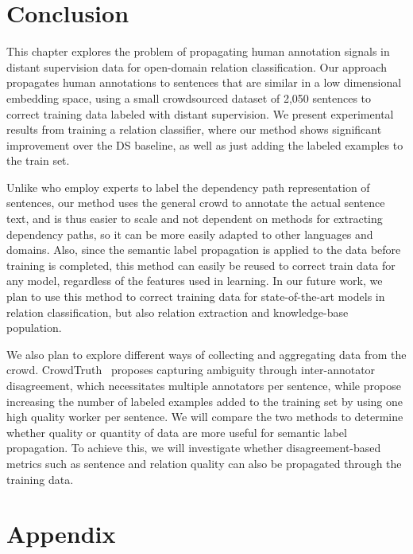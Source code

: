 \section{Conclusion}

This chapter explores the problem of propagating human annotation signals in distant supervision data for open-domain relation classification.  Our approach propagates human annotations to sentences that are similar in a low dimensional embedding space, using a small crowdsourced dataset of 2,050 sentences to correct training data labeled with distant supervision.  We present experimental results from training a relation classifier, where our method shows significant improvement over the DS baseline, as well as just adding the labeled examples to the train set.

Unlike \citet{sterckx2016knowledge} who employ experts to label the dependency path representation of sentences, our method uses the general crowd to annotate the actual sentence text, and is thus easier to scale and not dependent on methods for extracting dependency paths, so it can be more easily adapted to other languages and domains.  Also, since the semantic label propagation is applied to the data before training is completed, this method can easily be reused to correct train data for any model, regardless of the features used in learning.  In our future work, we plan to use this method to correct training data for state-of-the-art models in relation classification, but also relation extraction and knowledge-base population.

We also plan to explore different ways of collecting and aggregating data from the crowd. CrowdTruth~\cite{dumitrache2017false} proposes capturing ambiguity through inter-annotator disagreement, which necessitates multiple annotators per sentence, while \citet{liu2016effective} propose increasing the number of labeled examples added to the training set by using one high quality worker per sentence. We will compare the two methods to determine whether quality or quantity of data are more useful for semantic label propagation. To achieve this, we will investigate whether disagreement-based metrics such as sentence and relation quality can also be propagated through the training data.



\section*{Appendix}
\label{sec:appendix4.1}

